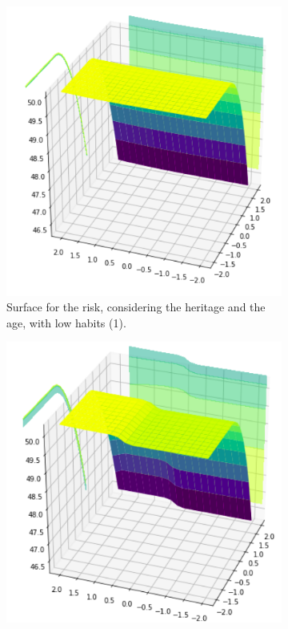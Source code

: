 \begin{figure}[ht]
\begin{subfigure}{.3\textwidth}
  \label{fig:sur2}
\end{subfigure}
\begin{subfigure}{.3\textwidth}
  \centering
  \includegraphics[width=.8\linewidth]{figures/surfaces/age-heritage1.png}  
  \caption{Surface for the risk, considering the heritage and the age, with low habits (1).}
  \label{fig:sur3}
\end{subfigure}
\begin{subfigure}{.3\textwidth}
  \centering
  \includegraphics[width=.8\linewidth]{figures/surfaces/habits-heritage4.png}  

\end{subfigure}
\end{figure}
